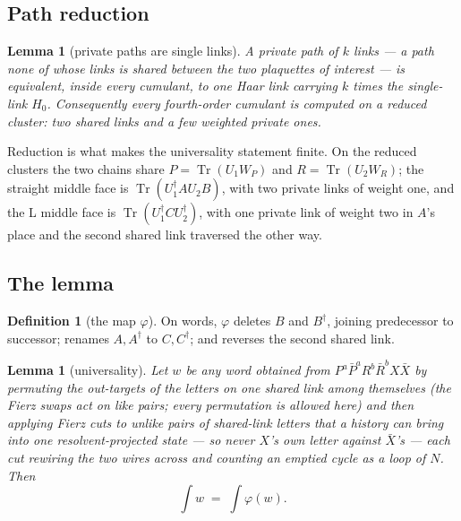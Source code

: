 \documentclass[11pt]{article}
\newtheorem{lemma}[theorem]{Lemma}
\theoremstyle{definition}
\newtheorem{definition}[theorem]{Definition}
\theoremstyle{remark}
\DeclareMathOperator{\Tr}{Tr}
\newcommand{\dg}{^{\dagger}}
\newcommand{\chk}[1]{}
\begin{document}
\subsection{Path reduction}

\begin{lemma}[private paths are single links]\label{lem:reduce}
A private path of $k$ links --- a path none of whose links is shared between the
two plaquettes of interest --- is equivalent, inside every cumulant, to one
Haar link carrying $k$ times the single-link $H_0$. Consequently every
fourth-order cumulant is computed on a \emph{reduced cluster}: two shared links
and a few weighted private ones.\chk{a private-link path is one effective link with k times the single-link H0: every three-cluster cumulant of the beta\_N assembly is the same, channel by channel in both sectors, on the reduced cluster as on the full one}
\end{lemma}

Reduction is what makes the universality statement finite. On the reduced
clusters the two chains share $P=\Tr(U_1W_P)$ and $R=\Tr(U_2W_R)$; the straight
middle face is $\Tr(U_1\dg AU_2B)$, with two private links of weight one, and
the L middle face is $\Tr(U_1\dg CU_2\dg)$, with one private link of weight two
in $A$'s place and the second shared link traversed the other way.

\subsection{The lemma}

\begin{definition}[the map $\varphi$]
On words, $\varphi$ deletes $B$ and $B\dg$, joining predecessor to successor;
renames $A,A\dg$ to $C,C\dg$; and reverses the second shared link.
\end{definition}

\begin{lemma}[universality]\label{lem:univ}
Let $w$ be any word obtained from $P^a\bar P^a R^b\bar R^b X\bar X$ by
permuting the out-targets of the letters on one shared link among themselves
(the Fierz swaps act on like pairs; every permutation is allowed here) and then
applying Fierz cuts to unlike pairs of shared-link letters that a history can
bring into one resolvent-projected state --- so never $X$'s own letter against
$\bar X$'s --- each cut rewiring the two wires across and counting an emptied
cycle as a loop of $N$. Then
\[
  \int w \;=\; \int \varphi(w).
\]
\end{lemma}
\end{document}
